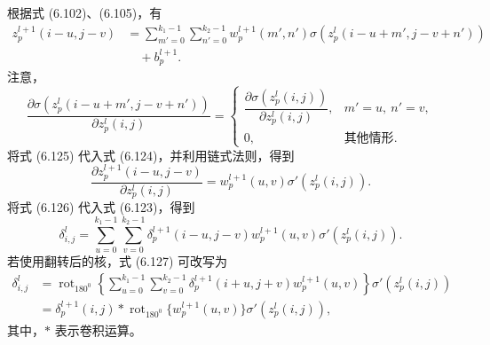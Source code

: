 根据式 (6.102)、(6.105)，有
\begin{equation}
\begin{aligned}
z_p^{l+1}(i-u,j-v)&=\sum_{m'=0}^{k_1-1}\sum_{n'=0}^{k_2-1}w_p^{l+1}(m',n')\sigma(z_p^l(i-u+m',j-v+n'))\\
&\quad+b_p^{l+1}.
\end{aligned}\tag{6.124}
\end{equation}
注意，
\begin{equation}
\frac{\partial\sigma(z_p^l(i-u+m',j-v+n'))}{\partial z_p^l(i,j)}=
\begin{cases}
\dfrac{\partial\sigma(z_p^l(i,j))}{\partial z_p^l(i,j)},&m'=u,\ n'=v,\\
0,&\text{其他情形}.
\end{cases}
\tag{6.125}
\end{equation}
将式 (6.125) 代入式 (6.124)，并利用链式法则，得到
\begin{equation}
\frac{\partial z_p^{l+1}(i-u,j-v)}{\partial z_p^l(i,j)}=w_p^{l+1}(u,v)\sigma'(z_p^l(i,j)).
\tag{6.126}
\end{equation}
将式 (6.126) 代入式 (6.123)，得到
\begin{equation}
\delta_{i,j}^l=\sum_{u=0}^{k_1-1}\sum_{v=0}^{k_2-1}\delta_p^{l+1}(i-u,j-v)w_p^{l+1}(u,v)\sigma'(z_p^l(i,j)).
\tag{6.127}
\end{equation}
若使用翻转后的核，式 (6.127) 可改写为
\begin{equation}
\begin{aligned}
\delta_{i,j}^l&=\operatorname{rot}_{180^0}\left\{\sum_{u=0}^{k_1-1}\sum_{v=0}^{k_2-1}\delta_p^{l+1}(i+u,j+v)w_p^{l+1}(u,v)\right\}\sigma'(z_p^l(i,j))\\
&=\delta_p^{l+1}(i,j)*\operatorname{rot}_{180^0}\{w_p^{l+1}(u,v)\}\sigma'(z_p^l(i,j)),
\end{aligned}\tag{6.128}
\end{equation}
其中，$*$ 表示卷积运算。

